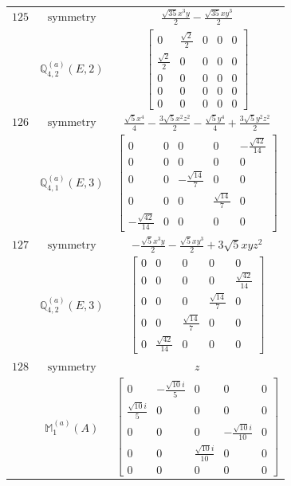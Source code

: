\documentclass[fleqn,8pt,landscape]{jsarticle}
\begin{document}
\begin{longtable}{ccc}
$ 125 $ & $ \text{symmetry} $ & $ \frac{\sqrt{35} x^{3} y}{2} - \frac{\sqrt{35} x y^{3}}{2} $ \\
$  $ & $ \mathbb{Q}_{4,2}^{(a)}(E,2) $ & $ \begin{bmatrix} 0 & \frac{\sqrt{2}}{2} & 0 & 0 & 0 \\ \frac{\sqrt{2}}{2} & 0 & 0 & 0 & 0 \\ 0 & 0 & 0 & 0 & 0 \\ 0 & 0 & 0 & 0 & 0 \\ 0 & 0 & 0 & 0 & 0 \end{bmatrix} $ \\ \hline
$ 126 $ & $ \text{symmetry} $ & $ \frac{\sqrt{5} x^{4}}{4} - \frac{3 \sqrt{5} x^{2} z^{2}}{2} - \frac{\sqrt{5} y^{4}}{4} + \frac{3 \sqrt{5} y^{2} z^{2}}{2} $ \\
$  $ & $ \mathbb{Q}_{4,1}^{(a)}(E,3) $ & $ \begin{bmatrix} 0 & 0 & 0 & 0 & - \frac{\sqrt{42}}{14} \\ 0 & 0 & 0 & 0 & 0 \\ 0 & 0 & - \frac{\sqrt{14}}{7} & 0 & 0 \\ 0 & 0 & 0 & \frac{\sqrt{14}}{7} & 0 \\ - \frac{\sqrt{42}}{14} & 0 & 0 & 0 & 0 \end{bmatrix} $ \\ \hline
$ 127 $ & $ \text{symmetry} $ & $ - \frac{\sqrt{5} x^{3} y}{2} - \frac{\sqrt{5} x y^{3}}{2} + 3 \sqrt{5} x y z^{2} $ \\
$  $ & $ \mathbb{Q}_{4,2}^{(a)}(E,3) $ & $ \begin{bmatrix} 0 & 0 & 0 & 0 & 0 \\ 0 & 0 & 0 & 0 & \frac{\sqrt{42}}{14} \\ 0 & 0 & 0 & \frac{\sqrt{14}}{7} & 0 \\ 0 & 0 & \frac{\sqrt{14}}{7} & 0 & 0 \\ 0 & \frac{\sqrt{42}}{14} & 0 & 0 & 0 \end{bmatrix} $ \\ \hline
$ 128 $ & $ \text{symmetry} $ & $ z $ \\
$  $ & $ \mathbb{M}_{1}^{(a)}(A) $ & $ \begin{bmatrix} 0 & - \frac{\sqrt{10} i}{5} & 0 & 0 & 0 \\ \frac{\sqrt{10} i}{5} & 0 & 0 & 0 & 0 \\ 0 & 0 & 0 & - \frac{\sqrt{10} i}{10} & 0 \\ 0 & 0 & \frac{\sqrt{10} i}{10} & 0 & 0 \\ 0 & 0 & 0 & 0 & 0 \end{bmatrix} $ \\ \hline

\end{longtable}
\end{document}
